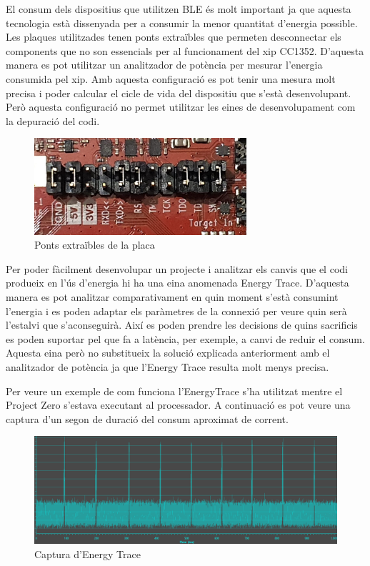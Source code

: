 El consum dels dispositius que utilitzen BLE és molt important ja que aquesta tecnologia està dissenyada per a consumir la menor quantitat d'energia possible.
Les plaques utilitzades tenen ponts extraïbles que permeten desconnectar els components que no son essencials per al funcionament del xip CC1352.
D'aquesta manera es pot utilitzar un analitzador de potència per mesurar l'energia consumida pel xip.
Amb aquesta configuració es pot tenir una mesura molt precisa i poder calcular el cicle de vida del dispositiu que s'està desenvolupant.
Però aquesta configuració no permet utilitzar les eines de desenvolupament com la depuració del codi.

\begin{figure}[h]
	\begin{center}
		\includegraphics[width=0.7\textwidth]{./images/ponts.jpg}
		\caption{Ponts extraïbles de la placa}
	\end{center}
\end{figure}

Per poder fàcilment desenvolupar un projecte i analitzar els canvis que el codi produeix en l'ús d'energia hi ha una eina anomenada Energy Trace.
D'aquesta manera es pot analitzar comparativament en quin moment s'està consumint l'energia i es poden adaptar els paràmetres de la connexió per veure quin serà l'estalvi que s'aconseguirà.
Així es poden prendre les decisions de quins sacrificis es poden suportar pel que fa a latència, per exemple, a canvi de reduir el consum.
Aquesta eina però no substitueix la solució explicada anteriorment amb el analitzador de potència ja que l'Energy Trace resulta molt menys precisa.

Per veure un exemple de com funciona l'EnergyTrace s'ha utilitzat mentre el Project Zero s'estava executant al processador. A continuació es pot veure una captura d'un segon de duració del consum aproximat de corrent.
\begin{figure}[!h]
	\begin{center}
		\includegraphics[width=\textwidth]{./images/energy_trace.png}
		\caption{Captura d'Energy Trace}
	\end{center}
\end{figure}

